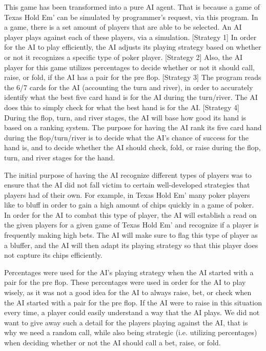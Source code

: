 \documentclass[10pt, a4paper, twocolumn]{article} %
\begin{document}
This game has been transformed into a pure AI agent. That is because a game of Texas Hold Em’ can be simulated by programmer’s request, via this program. In a game, there is a set amount of players that are able to be selected. An AI player plays against each of these players, via a simulation. [Strategy 1] In order for the AI to play efficiently, the AI adjusts its playing strategy based on whether or not it recognizes a specific type of poker player. [Strategy 2] Also, the AI player for this game utilizes percentages to decide whether or not it should call, raise, or fold, if the AI has a pair for the pre flop. [Strategy 3] The program reads the 6/7 cards for the AI (accounting the turn and river), in order to accurately identify what the best five card hand is for the AI during the turn/river. The AI does this to simply check for what the best hand is for the AI. [Strategy 4] During the flop, turn, and river stages, the AI will base how good its hand is based on a ranking system. The purpose for having the AI rank its five card hand during the flop/turn/river is to decide what the AI’s chance of success for the hand is, and to decide whether the AI should check, fold, or raise during the flop, turn, and river stages for the hand. 

The initial purpose of having the AI recognize different types of players was to ensure that the AI did not fall victim to certain well-developed strategies that players had of their own. For example, in Texas Hold Em’ many poker players like to bluff in order to gain a high amount of chips quickly in a game of poker. In order for the AI to combat this type of player, the AI will establish a read on the given players for a given game of Texas Hold Em’ and recognize if a player is frequently making high bets. The AI will make sure to flag this type of player as a bluffer, and the AI will then adapt its playing strategy so that this player does not capture its chips efficiently. 

Percentages were used for the AI’s playing strategy when the AI started with a pair for the pre flop. These percentages were used in order for the AI to play wisely, as it was not a good idea for the AI to always raise, bet, or check when the AI started with a pair for the pre flop. If the AI were to raise in this situation every time, a player could easily understand a way that the AI plays. We did not want to give away such a detail for the players playing against the AI, that is why we need a random call, while also being strategic (i.e. utilizing percentages) when deciding whether or not the AI should call a bet, raise, or fold. 
\end{document}
